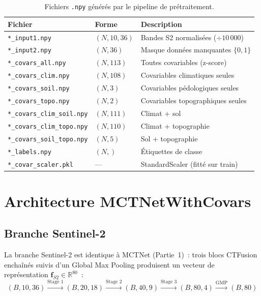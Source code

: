 \begin{table}[H]
\centering
\begin{tabular}{lll}
\hline
\textbf{Fichier} & \textbf{Forme} & \textbf{Description} \\
\hline
\texttt{*\_input1.npy}             & $(N, 10, 36)$ & Bandes S2 normalisées ($\div 10\,000$) \\
\texttt{*\_input2.npy}             & $(N, 36)$     & Masque données manquantes $\{0,1\}$ \\
\texttt{*\_covars\_all.npy}        & $(N, 113)$    & Toutes covariables (z-score) \\
\texttt{*\_covars\_clim.npy}       & $(N, 108)$    & Covariables climatiques seules \\
\texttt{*\_covars\_soil.npy}       & $(N, 3)$      & Covariables pédologiques seules \\
\texttt{*\_covars\_topo.npy}       & $(N, 2)$      & Covariables topographiques seules \\
\texttt{*\_covars\_clim\_soil.npy} & $(N, 111)$    & Climat + sol \\
\texttt{*\_covars\_clim\_topo.npy} & $(N, 110)$    & Climat + topographie \\
\texttt{*\_covars\_soil\_topo.npy} & $(N, 5)$      & Sol + topographie \\
\texttt{*\_labels.npy}             & $(N,)$        & Étiquettes de classe \\
\texttt{*\_covar\_scaler.pkl}      & ---           & StandardScaler (fitté sur train) \\
\hline
\end{tabular}
\caption{Fichiers \texttt{.npy} générés par le pipeline de prétraitement.}
\label{tab:npy_files}
\end{table}

\section{Architecture MCTNetWithCovars}

\subsection{Branche Sentinel-2}

La branche Sentinel-2 est identique à MCTNet (Partie~1)~: trois blocs CTFusion
enchaînés suivis d'un Global Max Pooling produisent un vecteur de représentation
$\mathbf{f}_{S2} \in \mathbb{R}^{80}$~:
\[
    (B, 10, 36)
    \xrightarrow{\text{Stage 1}} (B, 20, 18)
    \xrightarrow{\text{Stage 2}} (B, 40, 9)
    \xrightarrow{\text{Stage 3}} (B, 80, 4)
    \xrightarrow{\text{GMP}} (B, 80)
\]

